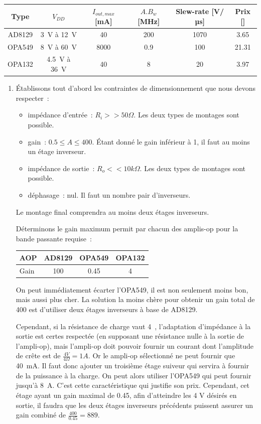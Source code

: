 \documentclass{../template/tp}
\begin{document}
{	\begin{center}
		\begin{tabular}{|c|c|c|c|c|c|} \hline
		Type & $V_{DD}$ & $I_{out, max}$ [mA] & $A.B_w$ [MHz] & Slew-rate [V/µs] & Prix [\EUR] \\ \hline
		AD8129 & 3~V à 12~V & 40 & 200 & 1070 & 3.65 \\ \hline %
		OPA549 & 8~V à 60~V & 8000 & 0.9 & 100 & 21.31 \\ \hline
		OPA132 & 4.5~V à 36~V & 40 & 8 & 20 & 3.97 \\ \hline
		\end{tabular}
	\end{center}
}
{
	\begin{enumerate}
		\item Établissons tout d'abord les contraintes de dimensionnement que nous devons respecter~:
		\begin{itemize}
			\item impédance d'entrée~: $R_i >> 50 \Omega$. Les deux types de montages sont possible.
			\item gain~: $0.5 \leq A \leq 400$. Étant donné le gain inférieur à 1, il faut au moins un étage inverseur.
			\item impédance de sortie~: $R_o << 10 k\Omega$. Les deux types de montages sont possible.
			\item déphasage~: nul. Il faut un nombre pair d'inverseurs.
		\end{itemize}

		Le montage final comprendra au moins deux étages inverseurs.

		Déterminons le gain maximum permit par chacun des amplis-op pour la bande passante requise~:

		\begin{center}
			\begin{tabular}{l|c|c|c}
			AOP & AD8129 & OPA549 & OPA132 \\ \hline
			Gain & 100 & 0.45 & 4 \\
			\end{tabular}
		\end{center}

		On peut immédiatement écarter l'OPA549, il est non seulement moins bon, mais aussi plus cher.
		La solution la moins chère pour obtenir un gain total de 400 est d'utiliser deux étages inverseurs à base de AD8129.

		Cependant, si la résistance de charge vaut 4~\ohm, l'adaptation d'impédance à la sortie est certes respectée (en supposant une résistance nulle à la sortie de l'ampli-op), mais l'ampli-op doit pouvoir fournir un courant dont l'amplitude de crête est de $\frac{4V}{4\Omega} = 1 A$.
		Or le ampli-op sélectionné ne peut fournir que 40~mA.
		Il faut donc ajouter un troisième étage suiveur qui servira à fournir de la puissance à la charge.
		On peut alors utiliser l'OPA549 qui peut fournir jusqu'à 8~A.
		C'est cette caractéristique qui justifie son prix.
		Cependant, cet étage ayant un gain maximal de 0.45, afin d'atteindre les 4 V désirés en sortie, il faudra que les deux étages inverseurs précédents puissent assurer un gain combiné de $\frac{400}{0.45} = 889$.


\end{enumerate}}
\end{document}
